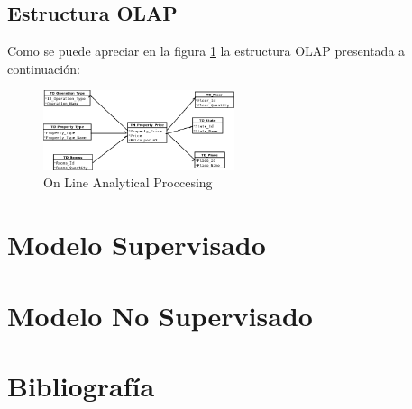 \documentclass[a4paper,12pt]{article}
\begin{document}
\subsection{Estructura OLAP}
Como se puede apreciar en la figura \ref{fig:2} la estructura OLAP presentada a continuación:
\begin{figure}[H]
\begin{center}
\includegraphics[width=0.50\textwidth]{OLAP.png}
\caption{On Line Analytical Proccesing}\label{fig:2}
\end{center}
\end{figure}
\section{Modelo Supervisado}
\section{Modelo No Supervisado}
\section{Bibliografía}


\nocite{*}
\end{document}
